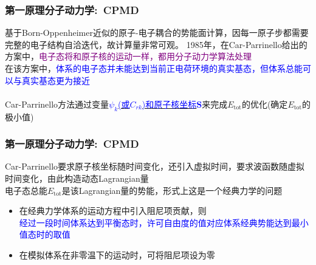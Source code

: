 \frame
{
	\frametitle{第一原理分子动力学:~\textrm{CPMD}}
	基于\textrm{Born-Oppenheimer}近似的原子-电子耦合的势能面计算，因每一原子步都需要完整的电子结构自洽迭代，故计算量非常可观。
\vskip 5pt
\textrm{1985}年，在\textrm{Car-Parrinello}给出的方案中，\textcolor{purple}{电子态将和原子核的运动一样，都用分子动力学算法处理}\\
在该方案中，\textcolor{blue}{体系的电子态并未能达到当前正电荷环境的真实基态，但体系总能可以与真实基态更为接近}\\
{\fontsize{6.2pt}{5.2pt}}\\
\textrm{Car-Parrinello}方法通过变量\underline{\textcolor{blue}{$\psi_k$(或$C_{rk}$)和原子核坐标$\mathbf{S}$}}来完成$E_{\mathrm{tot}}$的优化(确定$E_{\mathrm{tot}}$的极小值)
}

\frame
{
	\frametitle{第一原理分子动力学:~\textrm{CPMD}}
	{\fontsize{6.2pt}{5.2pt}}
	\vskip 5pt
	\textrm{Car-Parrinello}要求原子核坐标随时间变化，还引入虚拟时间，要求波函数随虚拟时间变化，由此构造动态\textrm{Lagrangian}量\\
	{\fontsize{6.2pt}{5.2pt}}
	电子态总能$E_{\mathrm{tot}}$是该\textrm{Lagrangian}量的势能，形式上这是一个经典力学的问题
	\begin{itemize}
		\item 在经典力学体系的运动方程中引入阻尼项贡献，则\\
			\textcolor{blue}{经过一段时间体系达到平衡态时，许可自由度的值对应体系经典势能达到最小值态时的取值}
		\item 在模拟体系在非零温下的运动时，可将阻尼项设为零
	\end{itemize}
}

